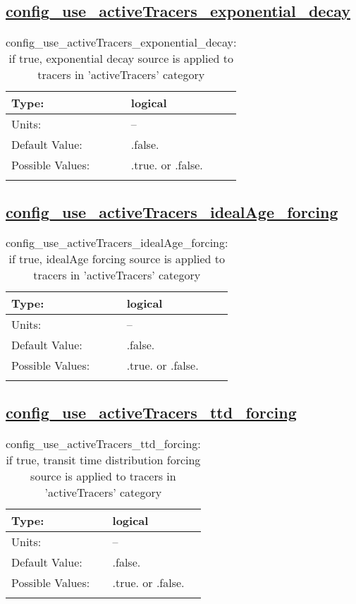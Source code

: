 \subsection[config\_use\_activeTracers\_exponential\_decay]{\hyperref[sec:nm_tab_tracer_forcing_activeTracers]{config\_use\_activeTracers\_exponential\_decay}}
\label{subsec:nm_sec_config_use_activeTracers_exponential_decay}
\begin{center}
\begin{longtable}{| p{2.0in} || p{4.0in} |}
    \hline
    Type: & logical \\
    \hline
    Units: & -- \\
    \hline
    Default Value: & .false. \\
    \hline
    Possible Values: & .true. or .false. \\
    \hline
    \caption{config\_use\_activeTracers\_exponential\_decay: if true, exponential decay source is applied to tracers in 'activeTracers' category}
\end{longtable}
\end{center}
\subsection[config\_use\_activeTracers\_idealAge\_forcing]{\hyperref[sec:nm_tab_tracer_forcing_activeTracers]{config\_use\_activeTracers\_idealAge\_forcing}}
\label{subsec:nm_sec_config_use_activeTracers_idealAge_forcing}
\begin{center}
\begin{longtable}{| p{2.0in} || p{4.0in} |}
    \hline
    Type: & logical \\
    \hline
    Units: & -- \\
    \hline
    Default Value: & .false. \\
    \hline
    Possible Values: & .true. or .false. \\
    \hline
    \caption{config\_use\_activeTracers\_idealAge\_forcing: if true, idealAge forcing source is applied to tracers in 'activeTracers' category}
\end{longtable}
\end{center}
\subsection[config\_use\_activeTracers\_ttd\_forcing]{\hyperref[sec:nm_tab_tracer_forcing_activeTracers]{config\_use\_activeTracers\_ttd\_forcing}}
\label{subsec:nm_sec_config_use_activeTracers_ttd_forcing}
\begin{center}
\begin{longtable}{| p{2.0in} || p{4.0in} |}
    \hline
    Type: & logical \\
    \hline
    Units: & -- \\
    \hline
    Default Value: & .false. \\
    \hline
    Possible Values: & .true. or .false. \\
    \hline
    \caption{config\_use\_activeTracers\_ttd\_forcing: if true, transit time distribution forcing source is applied to tracers in 'activeTracers' category}
\end{longtable}
\end{center}
